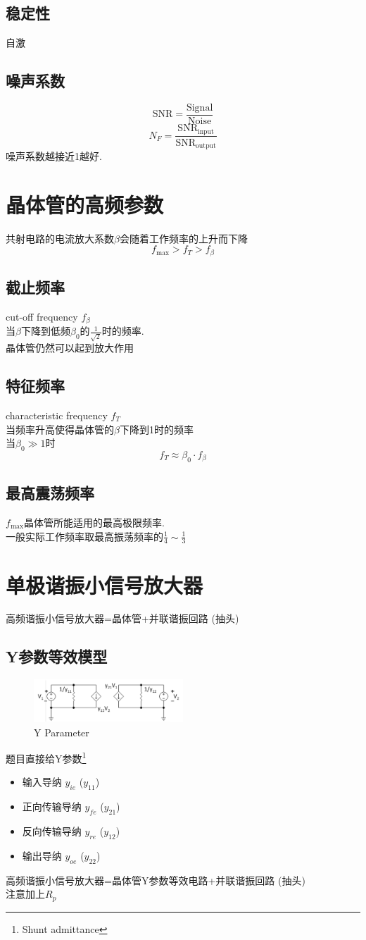 \documentclass[a4paper]{report}
\begin{document}
\subsection{稳定性}
自激
\subsection{噪声系数}
$$\text{SNR}=\frac{\text{Signal}}{\text{Noise}}$$
$$N_F=\frac{\text{SNR}_{\text{input}}}{\text{SNR}_{\text{output}}}$$
噪声系数越接近1越好. 
\section{晶体管的高频参数}
共射电路的电流放大系数$\beta$会随着工作频率的上升而下降
$$f_\text{max}>f_T>f_\beta$$
\subsection{截止频率}
cut-off frequency $f_\beta$\\
当$\beta$下降到低频$\beta_0$的$\frac{1}{\sqrt{2}}$时的频率. \\
晶体管仍然可以起到放大作用
\subsection{特征频率}
characteristic frequency $f_T$\\
当频率升高使得晶体管的$\beta$下降到1时的频率\\
当$\beta_0\gg 1$时
$$f_T\approx \beta_0\cdot f_\beta$$
\subsection{最高震荡频率}
$f_\text{max}$晶体管所能适用的最高极限频率. \\
一般实际工作频率取最高振荡频率的$\frac{1}{4}\sim\frac{1}{3}$
\section{单极谐振小信号放大器}
高频谐振小信号放大器=晶体管+并联谐振回路 (抽头)
\subsection{Y参数等效模型}
\begin{figure}[H]
\centering
\includegraphics[width=0.5\textwidth]{y_para.png}
\caption{Y Parameter}
\end{figure}
题目直接给Y参数\footnote{Shunt admittance}
\begin{itemize}
  \item 输入导纳 $y_{ie}$ ($y_{11}$)
  \item 正向传输导纳 $y_{fe}$ ($y_{21}$)
  \item 反向传输导纳 $y_{re}$ ($y_{12}$)
  \item 输出导纳 $y_{oe}$ ($y_{22}$)
\end{itemize}
高频谐振小信号放大器=晶体管Y参数等效电路+并联谐振回路 (抽头)\\
注意加上$R_p$
\end{document}
